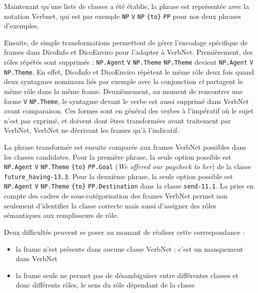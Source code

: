 Maintenant qu'une liste de classes a été établie, la phrase est représentée
avec la notation Verbnet, qui est par exemple \texttt{NP} \texttt{V}
\texttt{NP} \texttt{\{to\}} \texttt{PP} pour nos deux phrases d'exemples.

Ensuite, de simple transformations permettent de gérer l'encodage spécifique de
frames dans DicoInfo et DicoEnviro pour l'adapter à VerbNet. Premièrement, des
rôles répétés sont supprimés : \texttt{NP.Agent} \texttt{V} \texttt{NP.Theme}
\texttt{NP.Theme} devient \texttt{NP.Agent} \texttt{V} \texttt{NP.Theme}. En
effet, DicoInfo et DicoEnviro répètent le même rôle deux fois quand deux
syntagmes nominaux liés par exemple avec la conjonction \emph{et} partagent le
même rôle dans la même frame. Deuxièmement, au moment de rencontrer une forme
\texttt{V} \texttt{NP.Theme}, le syntagme devant le verbe est aussi supprimé
dans VerbNet avant comparaison. Ces formes sont en général des verbes à
l'impératif où le sujet n'est pas exprimé, et doivent dont êtres transformées
avant traitement par VerbNet, VerbNet ne décrivant les frames qu'à l'indicatif.

La phrase transformée est ensuite comparée aux frames VerbNet possibles dans
les classes candidates. Pour la première phrase, la seule option possible est
\texttt{NP.Agent} \texttt{V} \texttt{NP.Theme} \texttt{\{to\}} \texttt{PP.Goal}
(\textit{We offered our paycheck to her}) de la classe
\texttt{future\_having-13.3}. Pour la deuxième phrase, la seule option possible
est \texttt{NP.Agent} \texttt{V} \texttt{NP.Theme} \texttt{\{to\}}
\texttt{PP.Destination} dans la classe \texttt{send-11.1}. La prise en compte
des cadres de sous-catégorisation des frames VerbNet permet non seulement
d'identifier la classe correcte mais aussi d'assigner des rôles sémantiques aux
remplisseurs de rôle.

Deux difficultés peuvent se poser au momant de réaliser cette correspondance :
\begin{itemize}

    \item la frame n'est présente dans aucune classe VerbNet : c'est un
        manquement dans VerbNet

    \item la frame seule ne permet pas de désambiguïser entre différentes
        classes et donc différents rôles, le sens du rôle dépendant de la
        classe

\end{itemize}
        
